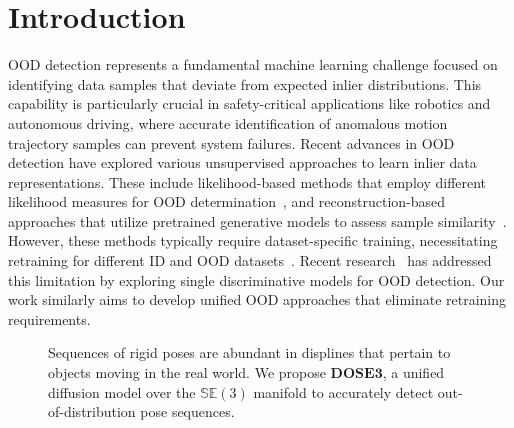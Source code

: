 \section{Introduction}


\ac{OOD} detection represents a fundamental machine learning challenge focused on identifying data samples that deviate from expected inlier distributions. This capability is particularly crucial in safety-critical applications like robotics and autonomous driving, where accurate identification of anomalous motion trajectory \citep{diag_teaching} samples can prevent system failures.
Recent advances in \ac{OOD} detection have explored various unsupervised approaches to learn inlier data representations. These include likelihood-based methods that employ different likelihood measures for \ac{OOD} determination~\citep{NEURIPS2020_8965f766, NEURIPS2019_1e795968, choi2019generative, RAN2022199}, and reconstruction-based approaches that utilize pretrained generative models to assess sample similarity~\citep{denouden2018improvingreconstructionautoencoderoutofdistribution, Wyatt_2022_CVPR, Graham_2023_CVPR}. However, these methods typically require dataset-specific training, necessitating retraining for different \ac{ID} and \ac{OOD} datasets~\citep{heng2024out}. Recent research~\citep{xiao2021reallyneedlearnrepresentations} has addressed this limitation by exploring single discriminative models for \ac{OOD} detection. Our work similarly aims to develop unified OOD approaches that eliminate retraining requirements.

\begin{figure}[t]
    \centering
{}
    \caption{Sequences of rigid poses are abundant in displines that pertain to objects moving in the real world. We propose $\mathbf{DOSE3}$, a unified diffusion model over the $\mathbb{SE}(3)$ manifold to accurately detect out-of-distribution pose sequences.}
    \label{fig:intro}
\end{figure}

